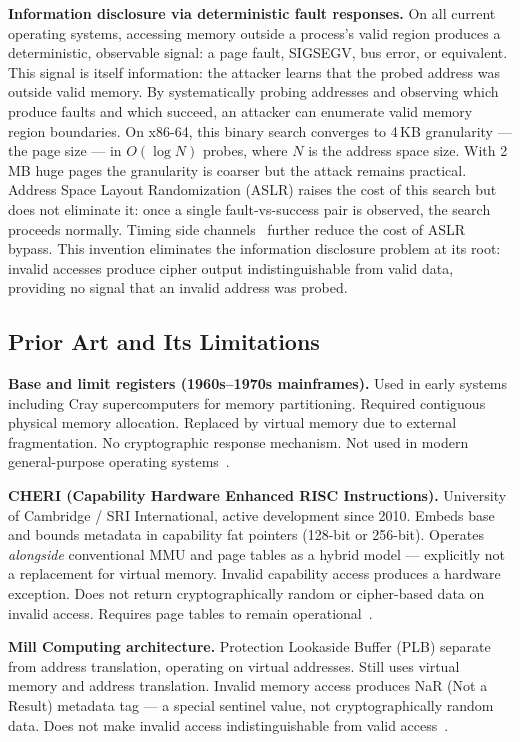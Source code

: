 \documentclass[12pt,letterpaper]{article}
\begin{document}
\textbf{Information disclosure via deterministic fault responses.}
On all current operating systems, accessing memory outside a process's
valid region produces a deterministic, observable signal: a page fault,
SIGSEGV, bus error, or equivalent.
This signal is itself information: the attacker learns that the probed
address was outside valid memory.
By systematically probing addresses and observing which produce faults
and which succeed, an attacker can enumerate valid memory region
boundaries.
On x86-64, this binary search converges to 4\,KB granularity ---
the page size --- in $O(\log N)$ probes, where $N$ is the address
space size.
With 2\,MB huge pages the granularity is coarser but the attack
remains practical.
Address Space Layout Randomization (ASLR) raises the cost of this
search but does not eliminate it: once a single fault-vs-success
pair is observed, the search proceeds normally.
Timing side channels~\cite{hund_timing} further reduce the cost
of ASLR bypass.
This invention eliminates the information disclosure problem at its
root: invalid accesses produce cipher output indistinguishable from
valid data, providing no signal that an invalid address was probed.

\subsection{Prior Art and Its Limitations}

\textbf{Base and limit registers (1960s--1970s mainframes).}
Used in early systems including Cray supercomputers for memory partitioning.
Required contiguous physical memory allocation.
Replaced by virtual memory due to external fragmentation.
No cryptographic response mechanism.
Not used in modern general-purpose operating systems~\cite{silberschatz}.

\textbf{CHERI (Capability Hardware Enhanced RISC Instructions).}
University of Cambridge / SRI International, active development since 2010.
Embeds base and bounds metadata in capability fat pointers (128-bit or 256-bit).
Operates \emph{alongside} conventional MMU and page tables as a hybrid model ---
explicitly not a replacement for virtual memory.
Invalid capability access produces a hardware exception.
Does not return cryptographically random or cipher-based data on invalid access.
Requires page tables to remain operational~\cite{cheri_isca,cheri_isa}.

\textbf{Mill Computing architecture.}
Protection Lookaside Buffer (PLB) separate from address translation,
operating on virtual addresses.
Still uses virtual memory and address translation.
Invalid memory access produces NaR (Not a Result) metadata tag ---
a special sentinel value, not cryptographically random data.
Does not make invalid access indistinguishable from valid access~\cite{mill}.
\end{document}
